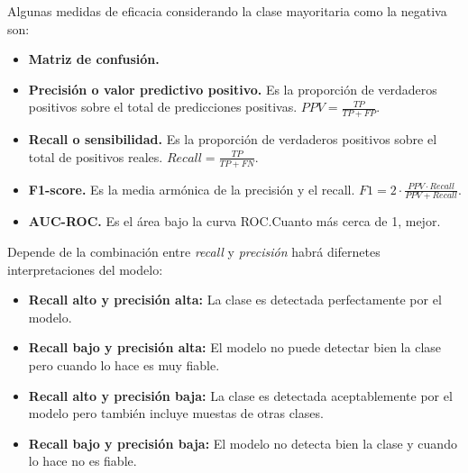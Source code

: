 \documentclass[12pt, letterpaper]{article}
\begin{document}
Algunas medidas de eficacia considerando la clase mayoritaria como la negativa son:
\begin{itemize}
    \item \textbf{Matriz de confusión.}
    \item \textbf{Precisión o valor predictivo positivo.} Es la proporción de verdaderos positivos sobre el total de predicciones positivas. $PPV = \frac{TP}{TP + FP}$.
    \item \textbf{Recall o sensibilidad.} Es la proporción de verdaderos positivos sobre el total de positivos reales. $Recall = \frac{TP}{TP + FN}$.
    \item \textbf{F1-score.} Es la media armónica de la precisión y el recall. $F1 = 2 \cdot \frac{PPV \cdot Recall}{PPV + Recall}$.
    \item \textbf{AUC-ROC.} Es el área bajo la curva ROC.\@ Cuanto más cerca de 1, mejor.
\end{itemize}

Depende de la combinación entre \textit{recall} y \textit{precisión} habrá difernetes interpretaciones del modelo:
\begin{itemize}
    \item \textbf{Recall alto y precisión alta:} La clase es detectada perfectamente por el modelo.
    \item \textbf{Recall bajo y precisión alta:} El modelo no puede detectar bien la clase pero cuando lo hace es muy fiable.
    \item \textbf{Recall alto y precisión baja:} La clase es detectada aceptablemente por el modelo pero también incluye muestas de otras clases.
    \item \textbf{Recall bajo y precisión baja:} El modelo no detecta bien la clase y cuando lo hace no es fiable.
\end{itemize}
\end{document}
